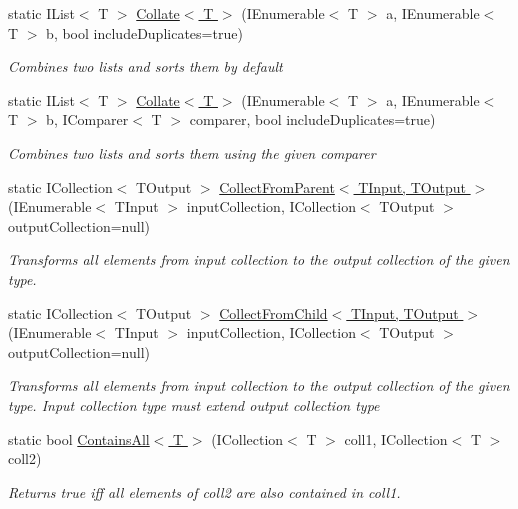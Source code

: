 \begin{DoxyCompactItemize}
static I\+List$<$ T $>$ \hyperlink{class_ultimate_1_1_utilities_1_1_collection_utils_a66612f2d5840415746e336d42de79c7b}{Collate$<$ T $>$} (I\+Enumerable$<$ T $>$ a, I\+Enumerable$<$ T $>$ b, bool include\+Duplicates=true)
\begin{DoxyCompactList}\small\item\em Combines two lists and sorts them by default \end{DoxyCompactList}\item 
static I\+List$<$ T $>$ \hyperlink{class_ultimate_1_1_utilities_1_1_collection_utils_aeefedff209f2d6a8e9e55189f8ffc5e5}{Collate$<$ T $>$} (I\+Enumerable$<$ T $>$ a, I\+Enumerable$<$ T $>$ b, I\+Comparer$<$ T $>$ comparer, bool include\+Duplicates=true)
\begin{DoxyCompactList}\small\item\em Combines two lists and sorts them using the given comparer \end{DoxyCompactList}\item 
static I\+Collection$<$ T\+Output $>$ \hyperlink{class_ultimate_1_1_utilities_1_1_collection_utils_ac87637b30288234337232164f4e3e541}{Collect\+From\+Parent$<$ T\+Input, T\+Output $>$} (I\+Enumerable$<$ T\+Input $>$ input\+Collection, I\+Collection$<$ T\+Output $>$ output\+Collection=null)
\begin{DoxyCompactList}\small\item\em Transforms all elements from input collection to the output collection of the given type. \end{DoxyCompactList}\item 
static I\+Collection$<$ T\+Output $>$ \hyperlink{class_ultimate_1_1_utilities_1_1_collection_utils_a4d72220b7a45eda6ace8b4102606b048}{Collect\+From\+Child$<$ T\+Input, T\+Output $>$} (I\+Enumerable$<$ T\+Input $>$ input\+Collection, I\+Collection$<$ T\+Output $>$ output\+Collection=null)
\begin{DoxyCompactList}\small\item\em Transforms all elements from input collection to the output collection of the given type. Input collection type must extend output collection type \end{DoxyCompactList}\item 
static bool \hyperlink{class_ultimate_1_1_utilities_1_1_collection_utils_a4e9f80473d58ac96f47645fef34bb65b}{Contains\+All$<$ T $>$} (I\+Collection$<$ T $>$ coll1, I\+Collection$<$ T $>$ coll2)
\begin{DoxyCompactList}\small\item\em Returns true iff all elements of coll2 are also contained in coll1. \end{DoxyCompactList}\item 

\end{DoxyCompactItemize}
